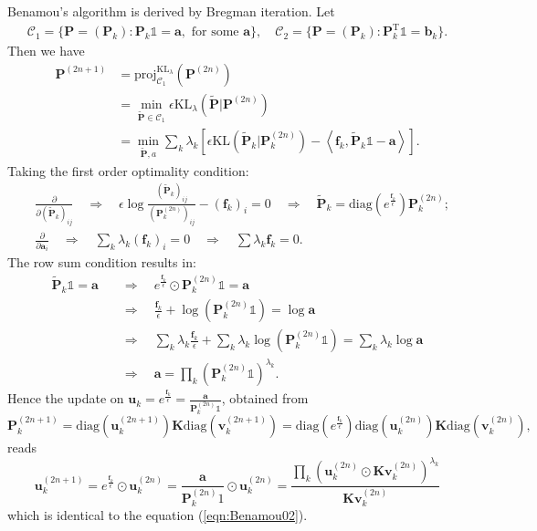 \documentclass[11pt]{book}
\begin{document}
Benamou's algorithm is derived by Bregman iteration. Let 
\begin{align}
\mathcal{C}_1 = \{\mathbf{P} = (\mathbf{P}_k) : \mathbf{P}_k \mathbb{1} = \mathbf{a}, \text{ for some } \mathbf{a}\}, \quad
\mathcal{C}_2 = \{\mathbf{P} = (\mathbf{P}_k) : \mathbf{P}_k^{\mathrm{T}}\mathbb{1} = \mathbf{b}_k\}.
\end{align}
Then we have
\begin{align*}
\mathbf{P}^{(2n+1)} &= \text{proj}_{\mathcal{C}_1}^{\mathrm{KL}_{\lambda}}(\mathbf{P}^{(2n)}) \\
& = \min_{\tilde{\mathbf{P}}\in\mathcal{C}_1} \epsilon \mathrm{KL}_{\lambda}(\tilde{\mathbf{P}}|\mathbf{P}^{(2n)}) \\
& = \min_{\tilde{\mathbf{P}}, a} \sum_k \lambda_k \left[ \epsilon\mathrm{KL}\left(\tilde{\mathbf{P}}_k|\mathbf{P}^{(2n)}_k\right) - \left\langle \mathbf{f}_k , \tilde{\mathbf{P}}_k \mathbb{1} - \mathbf{a} \right\rangle \right].
\end{align*}
Taking the first order optimality condition:
\begin{align*}
& \frac{\partial}{\partial (\tilde{\mathbf{P}}_k)_{ij}} \quad \Rightarrow \quad \epsilon \log \frac{(\tilde{\mathbf{P}}_k)_{ij}}{(\mathbf{P}^{(2n)}_k)_{ij}} - (\mathbf{f}_k)_i = 0 \quad \Rightarrow \quad \tilde{\mathbf{P}}_k = \text{diag}(e^{\frac{\mathbf{f}_k}{\epsilon}})\mathbf{P}_k^{(2n)}; \\
&\frac{\partial}{\partial \mathbf{a}_{i}}  \quad \Rightarrow \quad \sum_k \lambda_k (\mathbf{f}_k)_i = 0 \quad \Rightarrow \quad \sum \lambda_k \mathbf{f}_k = 0.
\end{align*}
The row sum condition results in:
\begin{align*}
\tilde{\mathbf{P}}_k \mathbb{1} = \mathbf{a} & \quad \Rightarrow \quad  e^{\frac{\mathbf{f}_k}{\epsilon}} \odot \mathbf{P}_k^{(2n)} \mathbb{1} = \mathbf{a} \\
& \quad \Rightarrow \quad \frac{\mathbf{f}_k}{\epsilon} + \log(\mathbf{P}_k^{(2n)} \mathbb{1}) = \log \mathbf{a} \\
& \quad \Rightarrow \quad \sum_k \lambda_k\frac{\mathbf{f}_k}{\epsilon} + \sum_k \lambda_k \log(\mathbf{P}_k^{(2n)} \mathbb{1}) = \sum_k \lambda_k \log \mathbf{a} \\
& \quad \Rightarrow \quad \mathbf{a} = \prod_k \left(\mathbf{P}_k^{(2n)} \mathbb{1}\right)^{\lambda_k}.
\end{align*}
Hence the update on $\mathbf{u}_k = e^{\frac{\mathbf{f}_k}{\epsilon}} = \frac{\mathbf{a}}{\mathbf{P}_k^{(2n)} \mathbb{1}}$, obtained from
\[
\mathbf{P}_k^{(2n+1)} = \text{diag} \left(\mathbf{u}_k^{(2n+1)} \right) \mathbf{K}  \text{diag} \left(\mathbf{v}_k^{(2n+1)}\right) = \text{diag} \left(  e^{\frac{\mathbf{f}_k}{\epsilon}} \right) \text{diag}\left(\mathbf{u}_k^{(2n)} \right) \mathbf{K}  \text{diag} \left(\mathbf{v}_k^{(2n)}\right),
\]
reads
\[
\mathbf{u}_k^{(2n+1)} =  e^{\frac{\mathbf{f}_k}{\epsilon}} \odot \mathbf{u}_k^{(2n)} = \frac{\mathbf{a}}{\mathbf{P}_k^{(2n)}1} \odot \mathbf{u}_k^{(2n)}
= \frac{\prod_k \left( \mathbf{u}_k^{(2n)}\odot \mathbf{K}\mathbf{v}_k^{(2n)} \right)^{\lambda_k}}{\mathbf{K}\mathbf{v}_k^{(2n)}} 
\]
which is identical to the equation (\ref{eqn:Benamou02}).
\end{document}
